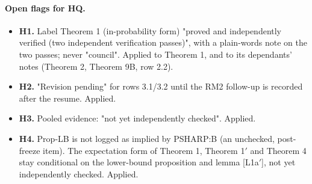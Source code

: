 \paragraph{Open flags for HQ.}
\begin{itemize}[leftmargin=1.5em]\footnotesize
\item \textbf{H1.} Label Theorem 1 (in-probability form) "proved and independently verified (two independent verification passes)", with a plain-words note on the two passes; never "council". Applied to Theorem 1, and to its dependants' notes (Theorem 2, Theorem 9B, row 2.2).
\item \textbf{H2.} "Revision pending" for rows 3.1/3.2 until the RM2 follow-up is recorded after the resume. Applied.
\item \textbf{H3.} Pooled evidence: "not yet independently checked". Applied.
\item \textbf{H4.} Prop-LB is not logged as implied by PSHARP:B (an unchecked, post-freeze item). The expectation form of Theorem 1, Theorem 1$'$ and Theorem 4 stay conditional on the lower-bound proposition and lemma [L1a$'$], not yet independently checked. Applied.
\end{itemize}
